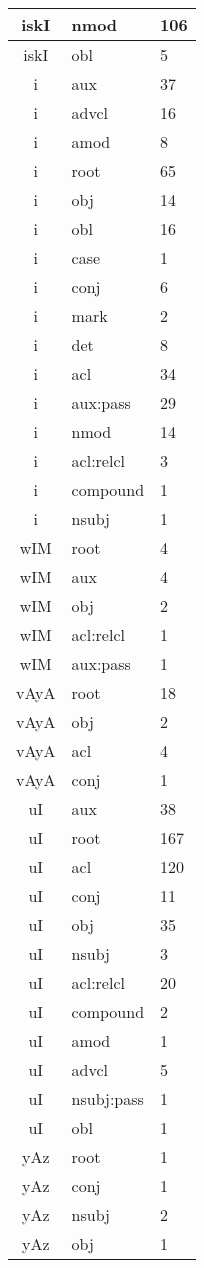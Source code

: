 \documentclass[a4 paper]{article}
\begin{document}
\begin{longtable}{cp{}p{}}
iskI & nmod & 106\\ \midrule iskI & obl & 5\\ \midrule 
i & aux & 37\\ \midrule i & advcl & 16\\ \midrule i & amod & 8\\ \midrule i & root & 65\\ \midrule i & obj & 14\\ \midrule i & obl & 16\\ \midrule i & case & 1\\ \midrule i & conj & 6\\ \midrule i & mark & 2\\ \midrule i & det & 8\\ \midrule i & acl & 34\\ \midrule i & aux:pass & 29\\ \midrule i & nmod & 14\\ \midrule i & acl:relcl & 3\\ \midrule i & compound & 1\\ \midrule i & nsubj & 1\\ \midrule 
wIM & root & 4\\ \midrule wIM & aux & 4\\ \midrule wIM & obj & 2\\ \midrule wIM & acl:relcl & 1\\ \midrule wIM & aux:pass & 1\\ \midrule 
vAyA & root & 18\\ \midrule vAyA & obj & 2\\ \midrule vAyA & acl & 4\\ \midrule vAyA & conj & 1\\ \midrule 
uI & aux & 38\\ \midrule uI & root & 167\\ \midrule uI & acl & 120\\ \midrule uI & conj & 11\\ \midrule uI & obj & 35\\ \midrule uI & nsubj & 3\\ \midrule uI & acl:relcl & 20\\ \midrule uI & compound & 2\\ \midrule uI & amod & 1\\ \midrule uI & advcl & 5\\ \midrule uI & nsubj:pass & 1\\ \midrule uI & obl & 1\\ \midrule 
yAz & root & 1\\ \midrule yAz & conj & 1\\ \midrule yAz & nsubj & 2\\ \midrule yAz & obj & 1\\ \midrule 

\end{longtable}
\end{document}

